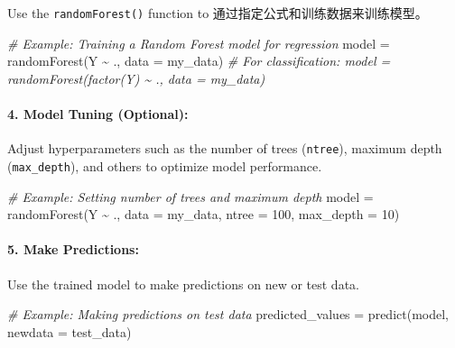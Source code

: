 \documentclass[
]{article}
\newenvironment{Shaded}{}{}
\newcommand{\AttributeTok}[1]{\textcolor[rgb]{0.49,0.56,0.16}{#1}}
\newcommand{\CommentTok}[1]{\textcolor[rgb]{0.38,0.63,0.69}{\textit{#1}}}
\newcommand{\DecValTok}[1]{\textcolor[rgb]{0.25,0.63,0.44}{#1}}
\newcommand{\FunctionTok}[1]{\textcolor[rgb]{0.02,0.16,0.49}{#1}}
\newcommand{\NormalTok}[1]{#1}
\newcommand{\OtherTok}[1]{\textcolor[rgb]{0.00,0.44,0.13}{#1}}
\newcommand{\SpecialCharTok}[1]{\textcolor[rgb]{0.25,0.44,0.63}{#1}}
\begin{document}
Use the \texttt{randomForest()} function to
通过指定公式和训练数据来训练模型。

\begin{Shaded}
\begin{Highlighting}[]
\CommentTok{\# Example: Training a Random Forest model for regression}
\NormalTok{model }\OtherTok{=} \FunctionTok{randomForest}\NormalTok{(Y }\SpecialCharTok{\textasciitilde{}}\NormalTok{ ., }\AttributeTok{data =}\NormalTok{ my\_data)}
\CommentTok{\# For classification: model = randomForest(factor(Y) \textasciitilde{} ., data = my\_data)}
\end{Highlighting}
\end{Shaded}

\hypertarget{4-model-tuning-optional}{%
\paragraph{\texorpdfstring{4. \textbf{Model Tuning
(Optional):}}{4. Model Tuning (Optional):}}\label{4-model-tuning-optional}}

Adjust hyperparameters such as the number of trees (\texttt{ntree}),
maximum depth (\texttt{max\_depth}), and others to optimize model
performance.

\begin{Shaded}
\begin{Highlighting}[]
\CommentTok{\# Example: Setting number of trees and maximum depth}
\NormalTok{model }\OtherTok{=} \FunctionTok{randomForest}\NormalTok{(Y }\SpecialCharTok{\textasciitilde{}}\NormalTok{ ., }\AttributeTok{data =}\NormalTok{ my\_data, }\AttributeTok{ntree =} \DecValTok{100}\NormalTok{, }\AttributeTok{max\_depth =} \DecValTok{10}\NormalTok{)}
\end{Highlighting}
\end{Shaded}

\hypertarget{5-make-predictions}{%
\paragraph{\texorpdfstring{5. \textbf{Make
Predictions:}}{5. Make Predictions:}}\label{5-make-predictions}}

Use the trained model to make predictions on new or test data.

\begin{Shaded}
\begin{Highlighting}[]
\CommentTok{\# Example: Making predictions on test data}
\NormalTok{predicted\_values }\OtherTok{=} \FunctionTok{predict}\NormalTok{(model, }\AttributeTok{newdata =}\NormalTok{ test\_data)}
\end{Highlighting}
\end{Shaded}
\end{document}
